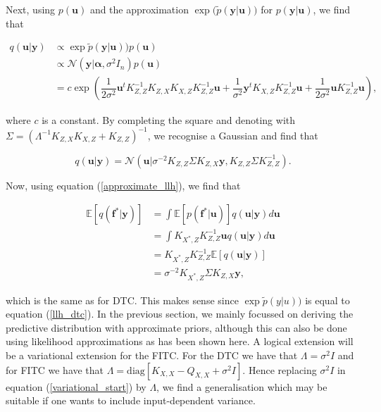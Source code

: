 \documentclass[12pt,a4paper,oneside]{book}
\begin{document}
Next, using $p(\bm{u})$ and the approximation $\exp{( \tilde{p}(\bm{y}|\bm{u})})$ for $p(\bm{y}|\bm{u})$, we find that

\begin{align}\label{marg_on_u}
q(\bm{u}|\bm{y}) &\propto \exp{ \tilde{p}(\bm{y}|\bm{u})) p(\bm{u})  }\nonumber \\
&\propto \mathcal{N}(\bm{y} | \bm{\alpha}, \sigma^2 I_n)  p(\bm{u}) \nonumber \\
&= c \exp{ \left( \dfrac{1}{2\sigma^2} \bm{u}^t K_{Z,Z}^{-1} K_{Z,X} K_{X,Z} K_{Z,Z}^{-1} \bm{u} + \dfrac{1}{\sigma^2} \bm{y}^t K_{X,Z} K_{Z,Z}^{-1} \bm{u} + \dfrac{1}{2\sigma^2} \bm{u} K_{Z,Z}^{-1} \bm{u} \right) },
\end{align}

where $c$ is a constant. By completing the square and denoting with $\Sigma = (\Lambda^{-1} K_{Z,X}K_{X,Z} + K_{Z,Z})^{-1}$, we recognise a Gaussian and find that

\begin{equation}\label{optimal_q}
q(\bm{u}|\bm{y}) =  \mathcal{N} (\bm{u}|\sigma^{-2} K_{Z,Z} \Sigma K_{Z,X} \bm{y}, K_{Z,Z}\Sigma K_{Z,Z}^{-1}).
\end{equation}

Now, using equation (\ref{approximate_llh}), we find that 

\begin{align} \label{mean_predicitive_dtc}
\mathbb{E} [q(\bm{f}^{\ast}|\bm{y})] &= \int \mathbb{E} [p(\bm{f}^{\ast}|\bm{u})] q(\bm{u}|\bm{y}) d\bm{u}  \nonumber \\
&= \int K_{X^{\ast},Z} K_{Z,Z}^{-1} \bm{u} q(\bm{u}|\bm{y}) d\bm{u} \nonumber \\
&= K_{X^{\ast},Z} K_{Z,Z}^{-1} \mathbb{E} [q(\bm{u}|\bm{y})] \nonumber \\ &= \sigma^{-2} K_{X^{\ast},Z} \Sigma K_{Z,X} \bm{y},
\end{align}

which is the same as for DTC. This makes sense since $\exp{ \tilde{p}(y|u))}$ is equal to equation (\ref{llh_dtc}). In the previous section, we mainly focussed on deriving the predictive distribution with approximate priors, although this can also be done using likelihood approximations as has been shown here. A logical extension will be a variational extension for the FITC. For the DTC we have that $\Lambda = \sigma^2 I$ and for FITC we have that $\Lambda = \text{diag}[K_{X,X}-Q_{X,X} + \sigma^2 I]$. Hence replacing $\sigma^2 I$ in equation (\ref{variational_start}) by $\Lambda$, we find a generalisation which may be suitable if one wants to include input-dependent variance.
\end{document}
